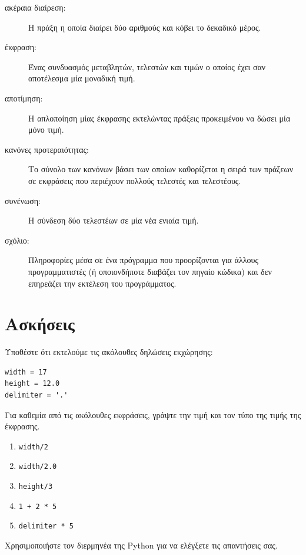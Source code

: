 \documentclass[10pt]{book}
\begin{document}
\begin{description}
\item[ακέραια διαίρεση:] Η πράξη η οποία διαίρει δύο αριθμούς και κόβει
	το δεκαδικό μέρος.

\item[έκφραση:] Ένας συνδυασμός μεταβλητών, τελεστών και τιμών ο οποίος
	έχει σαν αποτέλεσμα μία μοναδική τιμή.

\item[αποτίμηση:]  Η απλοποίηση μίας έκφρασης εκτελώντας πράξεις προκειμένου
	να δώσει μία μόνο τιμή.

\item[κανόνες προτεραιότητας:]  Το σύνολο των κανόνων βάσει των οποίων καθορίζεται
	η σειρά των πράξεων σε εκφράσεις που περιέχουν πολλούς τελεστές και τελεστέους.

\item[συνένωση:]  Η σύνδεση δύο τελεστέων σε μία νέα ενιαία τιμή.

\item[σχόλιο:]  Πληροφορίες μέσα σε ένα πρόγραμμα που προορίζονται για άλλους
	προγραμματιστές (ή οποιονδήποτε διαβάζει τον πηγαίο κώδικα) και δεν επηρεάζει
	την εκτέλεση του προγράμματος.

\end{description}


\section{Ασκήσεις}


\begin{exercise}
Υποθέστε ότι εκτελούμε τις ακόλουθες δηλώσεις εκχώρησης:


\begin{verbatim}
width = 17
height = 12.0
delimiter = '.'
\end{verbatim}

Για καθεμία από τις ακόλουθες εκφράσεις, γράψτε την τιμή και τον
τύπο της τιμής της έκφρασης.


\begin{enumerate}

\item {\tt width/2}

\item {\tt width/2.0}

\item {\tt height/3}

\item {\tt 1 + 2 * 5}

\item {\tt delimiter * 5}

\end{enumerate}

Χρησιμοποιήστε τον διερμηνέα της  Python  για να ελέγξετε
τις απαντήσεις σας.\\
\end{exercise}
\end{document}
